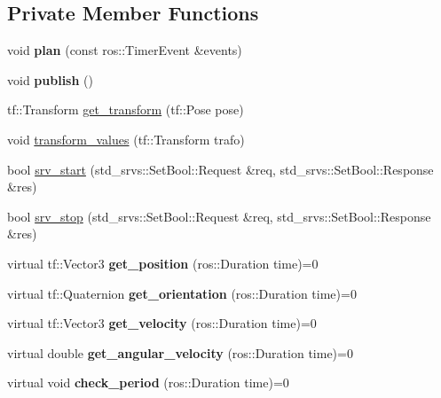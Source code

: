 \subsection*{Private Member Functions}
\begin{DoxyCompactItemize}
\item 
void {\bfseries plan} (const ros\+::\+Timer\+Event \&events)\hypertarget{classPlanner_a6ccd3cb4a24886ddeff615e665f2fbbd}{}\label{classPlanner_a6ccd3cb4a24886ddeff615e665f2fbbd}

\item 
void {\bfseries publish} ()\hypertarget{classPlanner_aa8937e0a808cebc224393438941515e4}{}\label{classPlanner_aa8937e0a808cebc224393438941515e4}

\item 
tf\+::\+Transform \hyperlink{classPlanner_a311803ff0901b953c4ff9db7a3f5bb01}{get\+\_\+transform} (tf\+::\+Pose pose)
\item 
void \hyperlink{classPlanner_a0ce8028259452e2e17ed07bbb0c8463a}{transform\+\_\+values} (tf\+::\+Transform trafo)
\item 
bool \hyperlink{classPlanner_aef1abb6588a8fb7953183bc5f3479857}{srv\+\_\+start} (std\+\_\+srvs\+::\+Set\+Bool\+::\+Request \&req, std\+\_\+srvs\+::\+Set\+Bool\+::\+Response \&res)
\item 
bool \hyperlink{classPlanner_ac98453a1cd02d1d77055900f4fc4741f}{srv\+\_\+stop} (std\+\_\+srvs\+::\+Set\+Bool\+::\+Request \&req, std\+\_\+srvs\+::\+Set\+Bool\+::\+Response \&res)
\item 
virtual tf\+::\+Vector3 {\bfseries get\+\_\+position} (ros\+::\+Duration time)=0\hypertarget{classPlanner_ab388545a3fd2f37f70403d8484473a12}{}\label{classPlanner_ab388545a3fd2f37f70403d8484473a12}

\item 
virtual tf\+::\+Quaternion {\bfseries get\+\_\+orientation} (ros\+::\+Duration time)=0\hypertarget{classPlanner_a161fc00d031fd65914dae8f4b2edeffb}{}\label{classPlanner_a161fc00d031fd65914dae8f4b2edeffb}

\item 
virtual tf\+::\+Vector3 {\bfseries get\+\_\+velocity} (ros\+::\+Duration time)=0\hypertarget{classPlanner_a02af8b9ab29a19bd82c1cc35afcf2cc5}{}\label{classPlanner_a02af8b9ab29a19bd82c1cc35afcf2cc5}

\item 
virtual double {\bfseries get\+\_\+angular\+\_\+velocity} (ros\+::\+Duration time)=0\hypertarget{classPlanner_ab5c6ec661acf83b1f095ba404dc4c958}{}\label{classPlanner_ab5c6ec661acf83b1f095ba404dc4c958}

\item 
virtual void {\bfseries check\+\_\+period} (ros\+::\+Duration time)=0\hypertarget{classPlanner_a1bc7f9ca05b5de8aa4c9ccda126c2be2}{}\label{classPlanner_a1bc7f9ca05b5de8aa4c9ccda126c2be2}

\end{DoxyCompactItemize}
